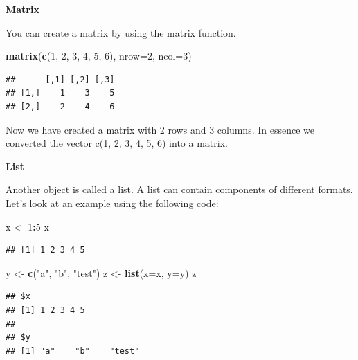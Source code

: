\documentclass[]{book}
\newenvironment{Shaded}{\begin{snugshade}}{\end{snugshade}}
\newcommand{\KeywordTok}[1]{\textcolor[rgb]{0.13,0.29,0.53}{\textbf{#1}}}
\newcommand{\DataTypeTok}[1]{\textcolor[rgb]{0.13,0.29,0.53}{#1}}
\newcommand{\DecValTok}[1]{\textcolor[rgb]{0.00,0.00,0.81}{#1}}
\newcommand{\StringTok}[1]{\textcolor[rgb]{0.31,0.60,0.02}{#1}}
\newcommand{\OperatorTok}[1]{\textcolor[rgb]{0.81,0.36,0.00}{\textbf{#1}}}
\newcommand{\NormalTok}[1]{#1}
\begin{document}
\textbf{Matrix}

You can create a matrix by using the matrix function.

\begin{Shaded}
\begin{Highlighting}[]
\KeywordTok{matrix}\NormalTok{(}\KeywordTok{c}\NormalTok{(}\DecValTok{1}\NormalTok{, }\DecValTok{2}\NormalTok{, }\DecValTok{3}\NormalTok{, }\DecValTok{4}\NormalTok{, }\DecValTok{5}\NormalTok{, }\DecValTok{6}\NormalTok{), }\DataTypeTok{nrow=}\DecValTok{2}\NormalTok{, }\DataTypeTok{ncol=}\DecValTok{3}\NormalTok{)}
\end{Highlighting}
\end{Shaded}

\begin{verbatim}
##      [,1] [,2] [,3]
## [1,]    1    3    5
## [2,]    2    4    6
\end{verbatim}

Now we have created a matrix with 2 rows and 3 columns. In essence we
converted the vector c(1, 2, 3, 4, 5, 6) into a matrix.

\textbf{List}

Another object is called a list. A list can contain components of
different formats. Let's look at an example using the following code:

\begin{Shaded}
\begin{Highlighting}[]
\NormalTok{x <-}\StringTok{ }\DecValTok{1}\OperatorTok{:}\DecValTok{5}
\NormalTok{x}
\end{Highlighting}
\end{Shaded}

\begin{verbatim}
## [1] 1 2 3 4 5
\end{verbatim}

\begin{Shaded}
\begin{Highlighting}[]
\NormalTok{y <-}\StringTok{ }\KeywordTok{c}\NormalTok{(}\StringTok{"a"}\NormalTok{, }\StringTok{"b"}\NormalTok{, }\StringTok{"test"}\NormalTok{)}
\NormalTok{z <-}\StringTok{ }\KeywordTok{list}\NormalTok{(}\DataTypeTok{x=}\NormalTok{x, }\DataTypeTok{y=}\NormalTok{y)}
\NormalTok{z}
\end{Highlighting}
\end{Shaded}

\begin{verbatim}
## $x
## [1] 1 2 3 4 5
## 
## $y
## [1] "a"    "b"    "test"
\end{verbatim}
\end{document}
